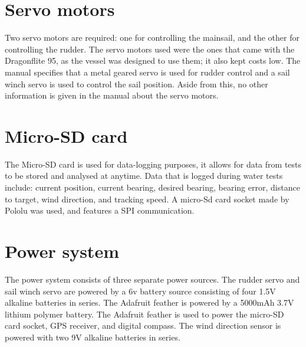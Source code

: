 \section{Servo motors}
Two servo motors are required: one for controlling the mainsail, and the other for controlling the rudder. The servo motors used were the ones that came with 
the Dragonflite 95, as the vessel was designed to use them; it also kept costs low. The manual specifies that a metal geared servo is used for rudder control
and a sail winch servo is used to control the sail position. Aside from this, no other information is given in the manual about the servo motors.  

\section{Micro-SD card}
The Micro-SD card is used for data-logging purposes, it allows for data from tests to be stored and analysed at anytime. Data that is logged during water tests 
include: current position, current bearing, desired bearing, bearing error, distance to target, wind direction, and tracking speed. A micro-Sd card socket made 
by Pololu was used, and features a SPI communication.  

\section{Power system}
The power system consists of three separate power sources. The rudder servo and sail winch servo are powered by a 6v battery source consisting of four 1.5V
alkaline batteries in series. The Adafruit feather is powered by a 5000mAh 3.7V lithium polymer battery. The Adafruit feather is used to power the micro-SD 
card socket, GPS receiver, and digital compass. The wind direction sensor is powered with two 9V alkaline batteries in series. %

